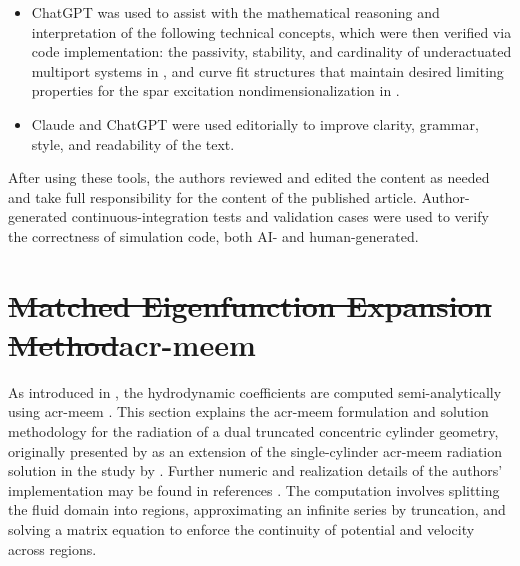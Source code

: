 \documentclass[a4paper,fleqn,colorlinks,unicode,lineno]{cas-dc} %
\makeatletter
\newcommand{\JOURNALTWOCOLUMN}{} %
\providecommand{\DIFdeltex}[1]{{\protect\color{red}\sout{#1}}} %
\providecommand{\DIFaddbegin}{} %
\providecommand{\DIFaddend}{} %
\providecommand{\DIFdelbegin}{} %
\providecommand{\DIFdelend}{} %
\providecommand{\DIFdel}[1]{\texorpdfstring{\DIFdeltex{#1}}{}} %
\providecommand{\DIFscaledelfig}{0.5}
\newlength{\DIFdelgraphicswidth} %
\newlength{\DIFdelgraphicsheight} %
\providecommand{\DIFaddincludegraphics}[2][]{{\color{blue}\fbox{\DIFOincludegraphics[#1]{#2}}}} %
\providecommand{\DIFdelincludegraphics}[2][]{%
\sbox{\DIFdelgraphicsbox}{\DIFOincludegraphics[#1]{#2}}%
\settoboxwidth{\DIFdelgraphicswidth}{\DIFdelgraphicsbox} %
\settoboxtotalheight{\DIFdelgraphicsheight}{\DIFdelgraphicsbox} %
\scalebox{\DIFscaledelfig}{%
\parbox[b]{\DIFdelgraphicswidth}{\usebox{\DIFdelgraphicsbox}\\[-\baselineskip] \rule{\DIFdelgraphicswidth}{0em}}\llap{\resizebox{\DIFdelgraphicswidth}{\DIFdelgraphicsheight}{%
\setlength{\unitlength}{\DIFdelgraphicswidth}%
\begin{picture}(1,1)%
\thicklines\linethickness{2pt} %
{\color[rgb]{1,0,0}\put(0,0){\framebox(1,1){}}}%
{\color[rgb]{1,0,0}\put(0,0){\line( 1,1){1}}}%
{\color[rgb]{1,0,0}\put(0,1){\line(1,-1){1}}}%
\end{picture}%
}\hspace*{3pt}}} %
} %
\DeclareRobustCommand{\DIFaddbegin}{\DIFOaddbegin \let\includegraphics\DIFaddincludegraphics} %
\DeclareRobustCommand{\DIFaddend}{\DIFOaddend \let\includegraphics\DIFOincludegraphics} %
\DeclareRobustCommand{\DIFdelbegin}{\DIFOdelbegin \let\includegraphics\DIFdelincludegraphics} %
\DeclareRobustCommand{\DIFdelend}{\DIFOaddend \let\includegraphics\DIFOincludegraphics} %
\let\sout@orig\sout %
\renewcommand{\sout}[1]{\ifmmode\text{\sout@orig{\ensuremath{#1}}}\else\sout@orig{#1}\fi} %
\makeatother
\begin{document}
\begin{itemize}[leftmargin=*]
the circle/ellipse intersection formulas in ;
the sensitivity formulas for the \gls{acr-pto} limit in ;
the curvature of the function in ;
the trigonometric simplifications in the slamming angle formula in .
\item ChatGPT was used to assist with the mathematical reasoning and interpretation of the following technical concepts, which were then verified via code implementation: the passivity, stability, and cardinality of underactuated multiport systems in , and curve fit structures that maintain desired limiting properties for the spar excitation nondimensionalization in .
\item Claude and ChatGPT were used editorially to improve clarity, grammar, style, and readability of the text.
\end{itemize}
After using these tools, the authors reviewed and edited the content as needed and take full responsibility for the content of the published article.
Author-generated continuous-integration tests and validation cases were used to verify the correctness of simulation code, both AI- and human-generated.


\appendix
\DIFaddbegin 

\DIFaddend \ifdefined\JOURNALTWOCOLUMN
    \onecolumn%
\fi

 \newpage %

\section{\DIFdelbegin \DIFdel{Matched Eigenfunction Expansion Method}\DIFdelend \DIFaddbegin \acrlong{acr-meem}\DIFaddend }
\label{sec:appendix-meem-details}
As introduced in , the hydrodynamic coefficients are computed semi-analytically using \gls{acr-meem} .
This section explains the \gls{acr-meem} formulation and solution methodology for the radiation of a dual truncated concentric cylinder geometry, originally presented by \citet{mavrakos_hydrodynamic_2004,chau_inertia_2010,chau_inertia_2012} as an extension of the single-cylinder \gls{acr-meem} radiation solution in the study by \citet{yeung_added_1981}.
Further numeric and realization details of the authors' implementation may be found in references \citet{bimali_matrix_2026,best_openflash_2026,mccabe_open-source_2024}.
The computation involves splitting the fluid domain into regions, approximating an infinite series by truncation, and solving a matrix equation to enforce the continuity of potential and velocity across regions.
\end{document}
